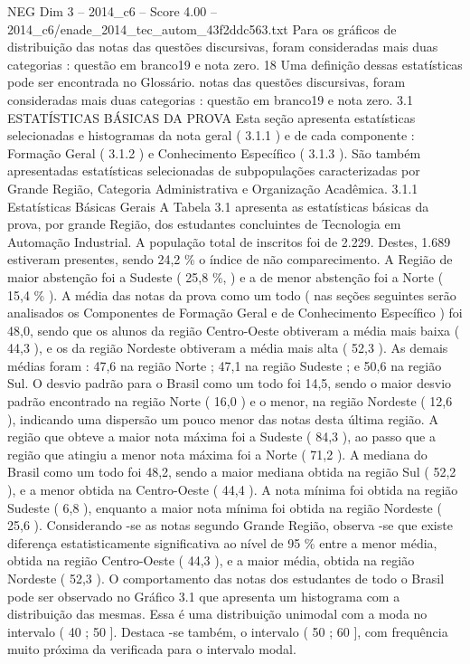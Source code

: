 \begin{textsample}{NEG Dim 3 – 2014\_c6 – Score 4.00 – 2014\_c6/enade\_2014\_tec\_autom\_43f2ddc563.txt}
Para os gráficos de distribuição das notas das questões discursivas, foram consideradas mais duas categorias : questão em branco19 e nota zero. 18 Uma definição dessas estatísticas pode ser encontrada no Glossário. notas das questões discursivas, foram consideradas mais duas categorias : questão em branco19 e nota zero. 3.1 ESTATÍSTICAS BÁSICAS DA PROVA Esta seção apresenta estatísticas selecionadas e histogramas da nota geral ( 3.1.1 ) e de cada componente : Formação Geral ( 3.1.2 ) e Conhecimento Específico ( 3.1.3 ).
São também apresentadas estatísticas selecionadas de subpopulações caracterizadas por Grande Região, Categoria Administrativa e Organização Acadêmica. 3.1.1 Estatísticas Básicas Gerais A Tabela 3.1 apresenta as estatísticas básicas da prova, por grande Região, dos estudantes concluintes de Tecnologia em Automação Industrial.
A população total de inscritos foi de 2.229.
Destes, 1.689 estiveram presentes, sendo 24,2 \% o índice de não comparecimento.
A Região de maior abstenção foi a Sudeste ( 25,8 \%, ) e a de menor abstenção foi a Norte ( 15,4 \% ).
A média das notas da prova como um todo ( nas seções seguintes serão analisados os Componentes de Formação Geral e de Conhecimento Específico ) foi 48,0, sendo que os alunos da região Centro-Oeste obtiveram a média mais baixa ( 44,3 ), e os da região Nordeste obtiveram a média mais alta ( 52,3 ).
As demais médias foram : 47,6 na região Norte ; 47,1 na região Sudeste ; e 50,6 na região Sul.
O desvio padrão para o Brasil como um todo foi 14,5, sendo o maior desvio padrão encontrado na região Norte ( 16,0 ) e o menor, na região Nordeste ( 12,6 ), indicando uma dispersão um pouco menor das notas desta última região.
A região que obteve a maior nota máxima foi a Sudeste ( 84,3 ), ao passo que a região que atingiu a menor nota máxima foi a Norte ( 71,2 ).
A mediana do Brasil como um todo foi 48,2, sendo a maior mediana obtida na região Sul ( 52,2 ), e a menor obtida na Centro-Oeste ( 44,4 ).
A nota mínima foi obtida na região Sudeste ( 6,8 ), enquanto a maior nota mínima foi obtida na região Nordeste ( 25,6 ).
Considerando -se as notas segundo Grande Região, observa -se que existe diferença estatisticamente significativa ao nível de 95 \% entre a menor média, obtida na região Centro-Oeste ( 44,3 ), e a maior média, obtida na região Nordeste ( 52,3 ).
O comportamento das notas dos estudantes de todo o Brasil pode ser observado no Gráfico 3.1 que apresenta um histograma com a distribuição das mesmas.
Essa é uma distribuição unimodal com a moda no intervalo ( 40 ; 50 ].
Destaca -se também, o intervalo ( 50 ; 60 ], com frequência muito próxima da verificada para o intervalo modal.

\end{textsample}
